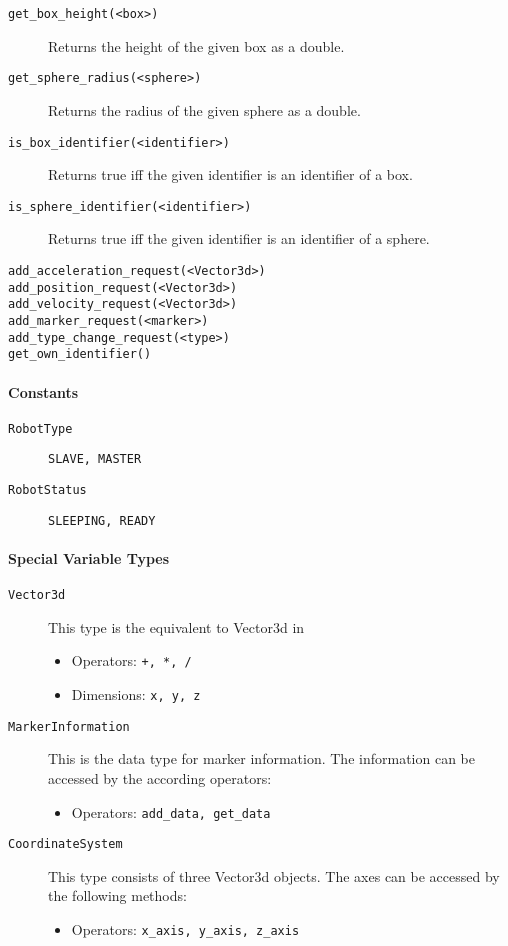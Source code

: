 \documentclass[a4paper,halfparskip,11pt,twoside]{scrartcl}
\begin{document}
\begin{description}
	\item [\texttt{get\_box\_height(<box>)}] Returns the height of the given box as a double.
	\item [\texttt{get\_sphere\_radius(<sphere>)}] Returns the radius of the given sphere as a double.
	\item [\texttt{is\_box\_identifier(<identifier>)}] Returns true iff the given identifier is an identifier of a box.
	\item [\texttt{is\_sphere\_identifier(<identifier>)}] Returns true iff the given identifier is an identifier of a sphere.
	\item [\texttt{add\_acceleration\_request(<Vector3d>)}] 
	\item [\texttt{add\_position\_request(<Vector3d>)}]
	\item [\texttt{add\_velocity\_request(<Vector3d>)}]
	\item [\texttt{add\_marker\_request(<marker>)}]
	\item [\texttt{add\_type\_change\_request(<type>)}]
	\item [\texttt{get\_own\_identifier()}]
\end{description}

\paragraph{\Lua Constants}
\begin{description}
	\item [\texttt{RobotType}] \texttt{SLAVE, MASTER}
	\item [\texttt{RobotStatus}] \texttt{SLEEPING, READY}
\end{description}

\paragraph{Special Variable Types}
\begin{description}
	\item [\texttt{Vector3d}] This type is the \Lua equivalent to Vector3d in \RSS
	\begin{itemize}
		\item Operators: \texttt{+, *, /}
		\item Dimensions: \texttt{x, y, z}
	\end{itemize}
	\item [\texttt{MarkerInformation}] This is the data type for marker information. The information can be accessed by the according operators:
	\begin{itemize}
		\item Operators: \texttt{add\_data, get\_data}
	\end{itemize}
	\item [\texttt{CoordinateSystem}] This type consists of three Vector3d objects. The axes can be accessed by the following methods:
	\begin{itemize}
		\item Operators: \texttt{x\_axis, y\_axis, z\_axis}
	\end{itemize}

\end{description}
\end{document}
